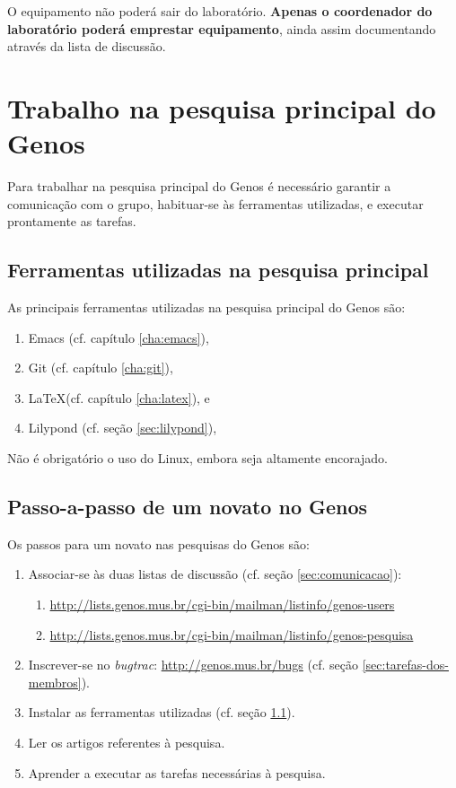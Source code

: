 \documentclass[12pt,brazil]{book}
\begin{document}
O equipamento não poderá sair do laboratório. \textbf{Apenas o
  coordenador do laboratório poderá emprestar equipamento}, ainda
assim documentando através da lista de discussão.

\section{Trabalho na pesquisa principal do Genos}
\label{sec:trabalho-na-pesquisa}

Para trabalhar na pesquisa principal do Genos é necessário garantir a
comunicação com o grupo, habituar-se às ferramentas utilizadas, e
executar prontamente as tarefas.

\subsection{Ferramentas utilizadas na pesquisa principal}
\label{sec:ferr-util-na}

As principais ferramentas utilizadas na pesquisa principal do Genos
são:

\begin{enumerate}
\item Emacs (cf. capítulo \ref{cha:emacs}),
\item Git (cf. capítulo \ref{cha:git}),
\item \LaTeX (cf. capítulo \ref{cha:latex}), e
\item Lilypond (cf. seção \ref{sec:lilypond}),
\end{enumerate}

Não é obrigatório o uso do Linux, embora seja altamente encorajado.

\subsection{Passo-a-passo de um novato no Genos}
\label{sec:passo-passo-de}

Os passos para um novato nas pesquisas do Genos são:

\begin{enumerate}
\item Associar-se às duas listas de discussão (cf. seção
  \ref{sec:comunicacao}):
  \begin{enumerate}
  \item \url{http://lists.genos.mus.br/cgi-bin/mailman/listinfo/genos-users}
  \item \url{http://lists.genos.mus.br/cgi-bin/mailman/listinfo/genos-pesquisa}
  \end{enumerate}
\item Inscrever-se no \textit{bugtrac}: \url{http://genos.mus.br/bugs}
  (cf. seção \ref{sec:tarefas-dos-membros}).
\item Instalar as ferramentas utilizadas (cf. seção
  \ref{sec:ferr-util-na}).
\item Ler os artigos referentes à pesquisa.
\item Aprender a executar as tarefas necessárias à pesquisa.
\end{enumerate}
\end{document}
